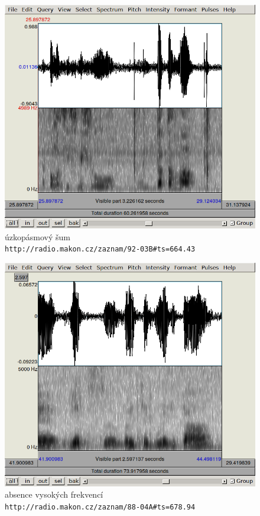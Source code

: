 \begin{figure}[htpb]
\includegraphics[scale=0.89]{rc/spectrum-narrow-92-03B.png}
\caption{
    úzkopásmový šum\\
    \texttt{http://radio.makon.cz/zaznam/92-03B\#ts=664.43}
}
\label{fig:spectr-narrow}
\end{figure}

\begin{figure}[htpb]
\includegraphics[scale=0.89]{rc/spectrum-nohighs-88-04A.png}
\caption{
    absence vysokých frekvencí\\
    \texttt{http://radio.makon.cz/zaznam/88-04A\#ts=678.94}
}
\label{fig:spectr-nohi}
\end{figure}

